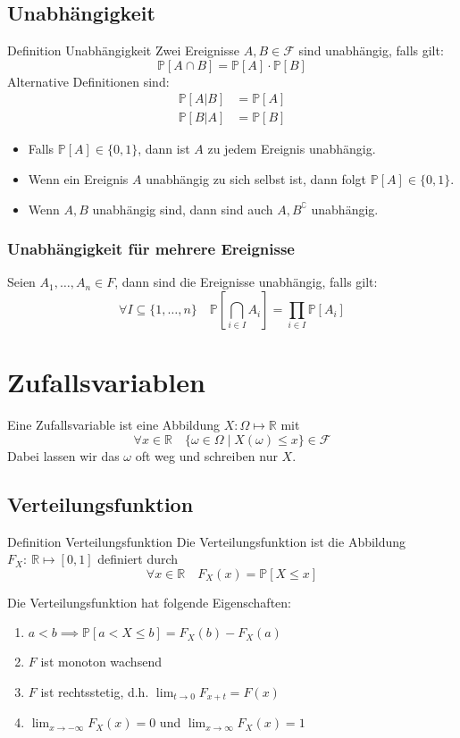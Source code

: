 \documentclass[a4paper,10pt]{article}
\def\R{\mathbb{R}}
\def\P{\mathbb{P}}
\def\F{\mathcal{F}}
\begin{document}
\subsection{Unabhängigkeit}
\begin{mainbox}{Definition Unabhängigkeit}
	Zwei Ereignisse \(A, B\in \F\) sind unabhängig, falls gilt:
	\[\P[A\cap B] = \P[A] \cdot \P[B]\]
	Alternative Definitionen sind:
	\begin{align*}
		\P[A|B] & = \P[A] \\
		\P[B|A] & = \P[B]
	\end{align*}
\end{mainbox}
\begin{itemize}
	\item Falls \(\P[A] \in \{0,1\}\), dann ist \(A\) zu jedem Ereignis unabhängig.
	\item Wenn ein Ereignis \(A\) unabhängig zu sich selbst ist, dann folgt \(\P[A] \in \{0,1\}\).
	\item Wenn \(A, B\) unabhängig sind, dann sind auch \(A, B^\complement\) unabhängig.
\end{itemize}
\subsubsection*{Unabhängigkeit für mehrere Ereignisse}
Seien \(A_1, \ldots, A_n \in F\), dann sind die Ereignisse unabhängig, falls gilt:
\[\forall I \subseteq \{1, \ldots, n\} \quad \P[\bigcap_{i\in I}A_i] = \prod_{i\in I} \P[A_i]\]

\section{Zufallsvariablen}
Eine Zufallsvariable ist eine Abbildung \(X: \Omega \mapsto \R\) mit
\[\forall x \in \R \quad \{\omega \in \Omega \mid X(\omega) \leq x\} \in \F\]
Dabei lassen wir das \(\omega\) oft weg und schreiben nur \(X\).

\subsection{Verteilungsfunktion}
\begin{mainbox}{Definition Verteilungsfunktion}
	Die Verteilungsfunktion ist die Abbildung \(F_X: \ \R \mapsto [0,1]\) definiert durch
	\[\forall x \in \R \quad F_X(x) = \P[X \le x]\]
\end{mainbox}
Die Verteilungsfunktion hat folgende Eigenschaften:
\begin{enumerate}
	\item \(a < b \implies \P[a < X \le b] = F_X(b) - F_X(a)\)
	\item \(F\) ist monoton wachsend
	\item \(F\) ist rechtsstetig, d.h. \(\lim_{t \to 0} F_{x+t} = F(x)\)
	\item \(\lim_{x\to - \infty} F_X(x) = 0\) und \(\lim_{x\to \infty} F_X(x) = 1\)
\end{enumerate}
\end{document}
